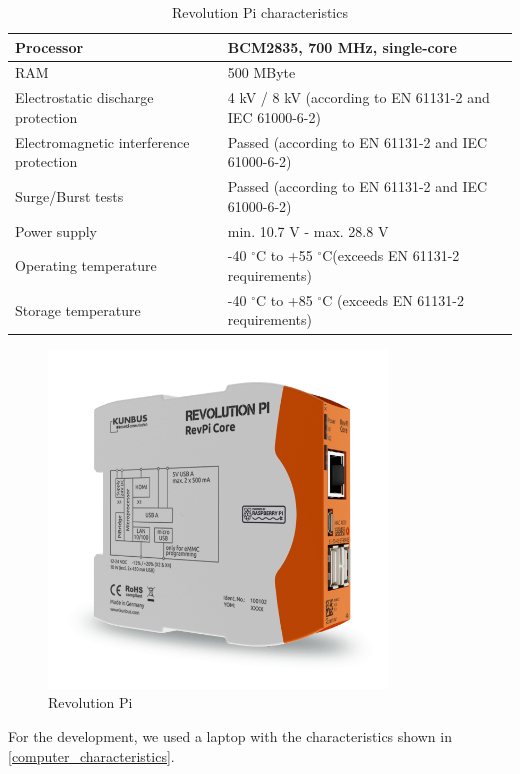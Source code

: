 \begin{table}[H]
    \begin{tabular}{|l|l|}
      \hline
      Processor & BCM2835, 700 MHz, single-core \\
      \hline
      RAM & 500 MByte \\
      \hline
      Electrostatic discharge protection & 4 kV / 8 kV (according to EN 61131-2 and IEC 61000-6-2) \\
      \hline
      Electromagnetic interference protection & Passed (according to EN 61131-2 and IEC 61000-6-2) \\
      \hline
      Surge/Burst tests & Passed (according to EN 61131-2 and IEC 61000-6-2) \\
      \hline
      Power supply &  min. 10.7 V - max. 28.8 V \\
      \hline
      Operating temperature & -40  $^\circ$C to +55 $^\circ$C(exceeds EN 61131-2 requirements) \\
      \hline
      Storage temperature & -40 $^\circ$C to +85 $^\circ$C (exceeds EN 61131-2 requirements) \\
      \hline
  \end{tabular}
  \caption[Revolution Pi characteristics]{Revolution Pi characteristics \cite{revpi}}
  \label{revpi_specs}
\end{table}

\begin{figure}[H]
\centering
\includegraphics[width=9cm]{figures/realization/revpi.png}
\caption{Revolution Pi}\label{revpi}
\end{figure}

For the development, we used a laptop with the characteristics shown in \autoref{computer_characteristics}.

